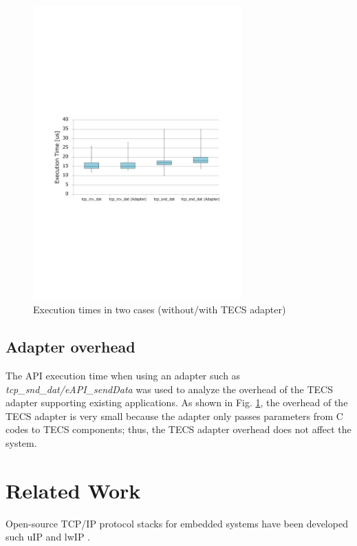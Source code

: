 \documentclass[conference]{IEEEtran/IEEEtran}
\begin{document}
\begin{figure}[t]
    \centering
    \includegraphics[width=8.0cm,clip]{figure/EvaluationOfAdapter.pdf}
    \vspace{-1mm} \caption{Execution times in two cases (without/with TECS adapter)}
    \vspace{-1mm} \label{fig:EvaluationOfAdapter}
\end{figure}

\subsection{Adapter overhead}

The API execution time when using an adapter such as {\it tcp\_snd\_dat/eAPI\_sendData} was used to analyze the overhead of the TECS adapter supporting existing applications.
As shown in Fig. \ref{fig:EvaluationOfAdapter}, the overhead of the TECS adapter is very small because the adapter only passes parameters from C codes to TECS components; thus, the TECS adapter overhead does not affect the system.



\section{Related Work}
\label{sec:Related Work}

Open-source TCP/IP protocol stacks for embedded systems have been developed such uIP \cite{par:uIP} and lwIP \cite{par:lwIP}.
\end{document}
